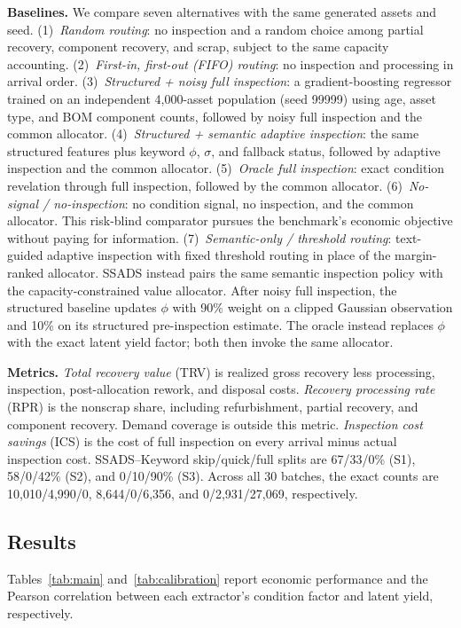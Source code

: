 \documentclass[a4paper,conference]{IEEEtran}
\begin{document}
\smallskip\noindent\textbf{Baselines.}
We compare seven alternatives with the same generated assets and seed.
(1)~\emph{Random routing}: no inspection and a random choice among partial
recovery, component recovery, and scrap, subject to the same capacity accounting.
(2)~\emph{First-in, first-out (FIFO) routing}: no inspection and processing in
arrival order.
(3)~\emph{Structured + noisy full inspection}: a gradient-boosting regressor trained on an independent
4,000-asset population (seed 99999) using age, asset type, and BOM component counts,
followed by noisy full inspection and the common allocator.
(4)~\emph{Structured + semantic adaptive inspection}: the same structured features plus keyword $\phi$, $\sigma$, and
fallback status, followed by adaptive inspection and the common allocator.
(5)~\emph{Oracle full inspection}: exact condition revelation through full inspection, followed by
the common allocator.
(6)~\emph{No-signal / no-inspection}: no condition signal, no inspection, and the common allocator.
This risk-blind comparator pursues the benchmark's economic objective without
paying for information.
(7)~\emph{Semantic-only / threshold routing}: text-guided adaptive inspection with
fixed threshold routing in place of the margin-ranked allocator. SSADS instead pairs
the same semantic inspection policy with the capacity-constrained value allocator.
After noisy full inspection, the structured
baseline updates $\phi$ with 90\% weight on a clipped Gaussian observation and 10\%
on its structured pre-inspection estimate. The oracle instead replaces $\phi$ with
the exact latent yield factor; both then invoke the same allocator.

\smallskip\noindent\textbf{Metrics.}
\emph{Total recovery value} (TRV) is realized gross recovery less processing,
inspection, post-allocation rework, and disposal costs. \emph{Recovery processing rate} (RPR) is
the nonscrap share, including refurbishment, partial recovery, and component
recovery. Demand coverage is outside this metric. \emph{Inspection cost savings} (ICS) is the cost of
full inspection on every arrival minus actual inspection cost.
SSADS--Keyword skip/quick/full splits are 67/33/0\% (S1), 58/0/42\% (S2), and
0/10/90\% (S3).
Across all 30 batches, the exact counts are 10,010/4,990/0,
8,644/0/6,356, and 0/2,931/27,069, respectively.

\subsection{Results}\label{sec:results}
Tables~\ref{tab:main} and~\ref{tab:calibration} report economic performance and the
Pearson correlation between each extractor's condition factor and latent yield,
respectively.
\end{document}
